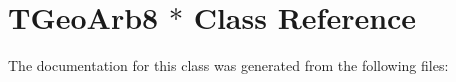 \hypertarget{class_t_geo_arb8_01_5}{}\section{T\+Geo\+Arb8 $\ast$ Class Reference}
\label{class_t_geo_arb8_01_5}


The documentation for this class was generated from the following files\+: